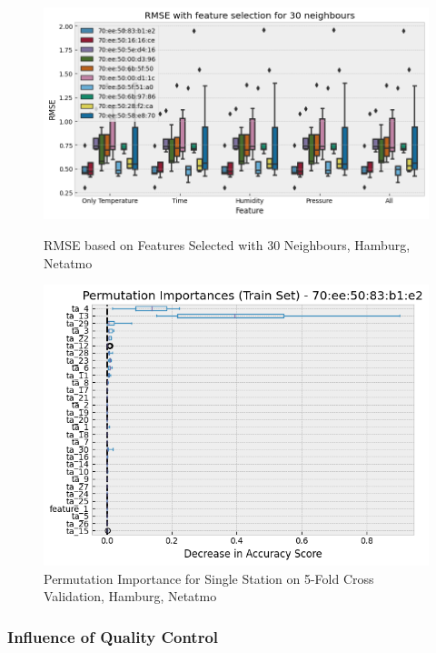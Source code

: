 \begin{figure}[htp]
    \centering
    \includegraphics[width=1\textwidth]{images/rmse_30_neighbours_feature_importance_by_pid.png}
    \caption{RMSE based on Features Selected with 30 Neighbours, Hamburg, Netatmo}
    \label{fig:eval feature importance 10 stations single location}

    \centering
    \includegraphics[width=1\textwidth]{images/rmse_30_neighbours_permutation_importance_by_pid.png}
    \caption{Permutation Importance for Single Station on 5-Fold Cross Validation, Hamburg, Netatmo}
    \label{fig:eval permutation importance single station}
\end{figure}

\subsubsection{Influence of Quality Control}

